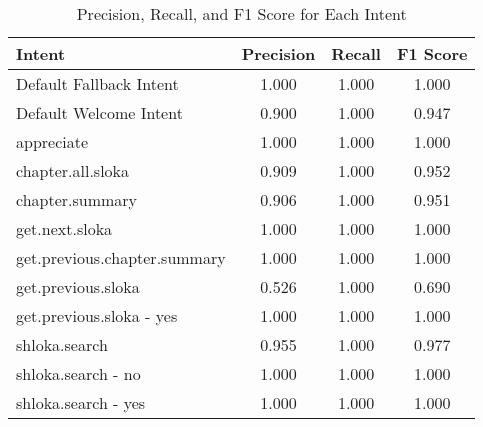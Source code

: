 \begin{table}[h]
\centering
\begin{tabular}{|l|c|c|c|}
\hline
\textbf{Intent} & \textbf{Precision} & \textbf{Recall} & \textbf{F1 Score} \\
\hline
Default Fallback Intent & 1.000 & 1.000 & 1.000 \\
\hline
Default Welcome Intent & 0.900 & 1.000 & 0.947 \\
\hline
appreciate & 1.000 & 1.000 & 1.000 \\
\hline
chapter.all.sloka & 0.909 & 1.000 & 0.952 \\
\hline
chapter.summary & 0.906 & 1.000 & 0.951 \\
\hline
get.next.sloka & 1.000 & 1.000 & 1.000 \\
\hline
get.previous.chapter.summary & 1.000 & 1.000 & 1.000 \\
\hline
get.previous.sloka & 0.526 & 1.000 & 0.690 \\
\hline
get.previous.sloka - yes & 1.000 & 1.000 & 1.000 \\
\hline
shloka.search & 0.955 & 1.000 & 0.977 \\
\hline
shloka.search - no & 1.000 & 1.000 & 1.000 \\
\hline
shloka.search - yes & 1.000 & 1.000 & 1.000 \\
\hline
\end{tabular}
\caption{Precision, Recall, and F1 Score for Each Intent}
\label{tab:intent_metrics}
\end{table}
